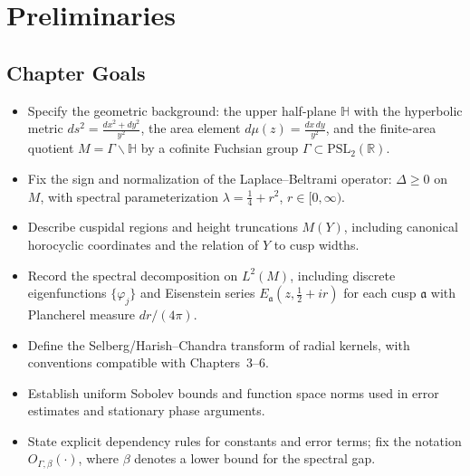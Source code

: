 \section{Preliminaries}


\subsection*{Chapter Goals}

\begin{itemize}[leftmargin=2em]
  \item[\textbf{(G1)}] Specify the geometric background: the upper half-plane
  $\mathbb{H}$ with the hyperbolic metric $ds^2=\frac{dx^2+dy^2}{y^2}$,
  the area element $d\mu(z)=\frac{dx\,dy}{y^2}$, and the finite-area
  quotient $M=\Gamma\backslash\mathbb{H}$ by a cofinite Fuchsian group
  $\Gamma\subset\mathrm{PSL}_2(\mathbb{R})$.

  \item[\textbf{(G2)}] Fix the sign and normalization of the Laplace--Beltrami
  operator: $\Delta\ge 0$ on $M$, with spectral parameterization
  $\lambda=\frac14+r^2$, $r\in[0,\infty)$.

  \item[\textbf{(G3)}] Describe cuspidal regions and height truncations
  $M(Y)$, including canonical horocyclic coordinates and the relation of
  $Y$ to cusp widths.

  \item[\textbf{(G4)}] Record the spectral decomposition on $L^2(M)$, including
  discrete eigenfunctions $\{\varphi_j\}$ and Eisenstein series
  $E_{\mathfrak a}(z,\frac12+ir)$ for each cusp $\mathfrak a$ with
  Plancherel measure $dr/(4\pi)$.

  \item[\textbf{(G5)}] Define the Selberg/Harish–Chandra transform of radial
  kernels, with conventions compatible with Chapters~3–6.

  \item[\textbf{(G6)}] Establish uniform Sobolev bounds and function space
  norms used in error estimates and stationary phase arguments.

  \item[\textbf{(G7)}] State explicit dependency rules for constants and error
  terms; fix the notation $O_{\Gamma,\beta}(\cdot)$, where $\beta$ denotes
  a lower bound for the spectral gap.
\end{itemize}

